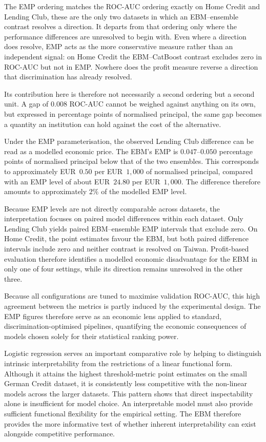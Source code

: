 The EMP ordering matches the ROC-AUC ordering exactly on Home Credit and Lending
Club, these are the only two datasets in which an EBM--ensemble contrast resolves a direction. It
departs from that ordering only where the performance differences are unresolved to
begin with. Even where a direction does resolve, EMP acts as the more conservative
measure rather than an independent signal: on Home Credit the EBM--CatBoost contrast
excludes zero in ROC-AUC but not in EMP. Nowhere does the profit measure reverse a
direction that discrimination has already resolved.

Its contribution here is therefore not necessarily a second ordering but a second unit. A gap of
$0.008$ ROC-AUC cannot be weighed against anything on its own, but expressed in percentage
points of normalised principal, the same gap becomes a quantity an institution can hold
against the cost of the alternative.

Under the EMP parameterisation, the observed Lending Club difference can be read as a
modelled economic price. The EBM's EMP is $0.047$--$0.050$ percentage points of
normalised principal below that of the two ensembles. This corresponds to approximately
EUR~$0.50$ per EUR~$1{,}000$ of normalised principal, compared with an EMP level of
about EUR~$24.80$ per EUR~$1{,}000$. The difference therefore amounts to approximately
$2\%$ of the modelled EMP level.

Because EMP levels are not directly comparable across datasets, the interpretation
focuses on paired model differences within each dataset. Only Lending Club yields paired
EBM--ensemble EMP intervals that exclude zero. On Home Credit, the point estimates favour
the EBM, but both paired difference intervals include zero and neither contrast is resolved
on Taiwan. Profit-based
evaluation therefore identifies a modelled economic disadvantage for the EBM in only one
of four settings, while its direction remains unresolved in the other three.

Because all configurations are tuned to maximise validation ROC-AUC, this high agreement between the metrics is partly induced by the experimental design. The EMP figures therefore serve as an economic lens applied to standard, discrimination-optimised pipelines, quantifying the economic consequences of models chosen solely for their statistical ranking power.

Logistic regression serves an important comparative role by helping to distinguish
intrinsic interpretability from the restrictions of a linear functional form. Although
it attains the highest threshold-metric point estimates on the small German Credit
dataset, it is consistently less competitive with the non-linear models across the 
larger datasets. This pattern shows that direct inspectability alone is insufficient 
for model choice. An interpretable model must also provide sufficient functional 
flexibility for the empirical setting. The EBM therefore provides the more informative 
test of whether inherent interpretability can exist alongside competitive performance.

